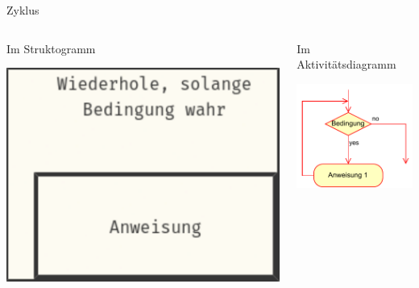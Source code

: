 \documentclass[xelatex,aspectratio=169]{beamer}
\begin{document}
\begin{frame}{Zyklus}

  \begin{columns}[t]
    \begin{column}{.3\linewidth}
      \begin{block}{Im Struktogramm}
        \begin{minipage}[c][.7\textheight][c]{\textwidth}
          \centering
          \includegraphics[width=\textwidth]{fig/algorithmus_zyklus_struktogram.pdf}
        \end{minipage}
      \end{block}
    \end{column}
    \begin{column}{.3\linewidth}
      \begin{block}{Im Aktivitätsdiagramm}
        \begin{minipage}[c][.7\textheight][c]{\textwidth}
          \centering
          \includegraphics[width=\textwidth]{fig/algorithmus_zyklus_aktivitaetsdiagram.drawio.pdf}
        \end{minipage}
      \end{block}


\end{column}
\end{columns}
\end{frame}
\end{document}
